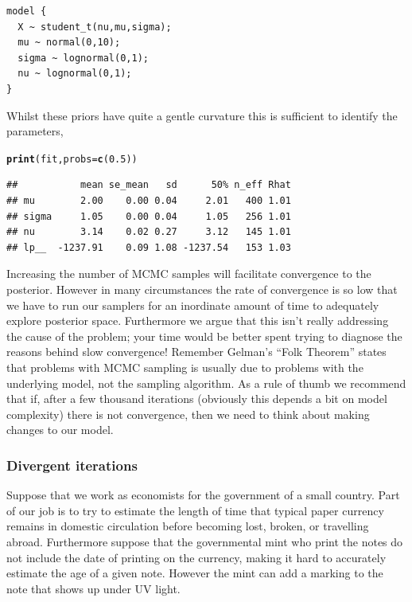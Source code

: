 \documentclass[11pt,fullpage]{book}
\makeatletter
\newenvironment{kframe}{%
	\def\at@end@of@kframe{}%
	\ifinner\ifhmode%
	\def\at@end@of@kframe{\end{minipage}}%
\begin{minipage}{\columnwidth}%
	\fi\fi%
	\def\FrameCommand##1{\hskip\@totalleftmargin \hskip-\fboxsep
		\colorbox{shadecolor}{##1}\hskip-\fboxsep
		\hskip-\linewidth \hskip-\@totalleftmargin \hskip\columnwidth}%
	\MakeFramed {\advance\hsize-\width
		\@totalleftmargin\z@ \linewidth\hsize
		\@setminipage}}%
{\par\unskip\endMakeFramed%
	\at@end@of@kframe}
\newcommand{\hlnum}[1]{\textcolor[rgb]{0.686,0.059,0.569}{#1}}%
\newcommand{\hlstd}[1]{\textcolor[rgb]{0.345,0.345,0.345}{#1}}%
\newcommand{\hlkwc}[1]{\textcolor[rgb]{0.333,0.667,0.333}{#1}}%
\newcommand{\hlkwd}[1]{\textcolor[rgb]{0.737,0.353,0.396}{\textbf{#1}}}%
\newenvironment{knitrout}{}{} %
\makeatother
\begin{document}
\begin{verbatim}
model { 
  X ~ student_t(nu,mu,sigma);
  mu ~ normal(0,10);
  sigma ~ lognormal(0,1);
  nu ~ lognormal(0,1);
}
\end{verbatim}

Whilst these priors have quite a gentle curvature this is sufficient to identify the parameters,

\begin{knitrout}\footnotesize
		\color{fgcolor}\begin{kframe}
\begin{alltt}
\hlkwd{print}\hlstd{(fit,}\hlkwc{probs} \hlstd{=} \hlkwd{c}\hlstd{(}\hlnum{0.5}\hlstd{))}
\end{alltt}
\begin{verbatim}
##           mean se_mean   sd      50% n_eff Rhat
## mu        2.00    0.00 0.04     2.01   400 1.01
## sigma     1.05    0.00 0.04     1.05   256 1.01
## nu        3.14    0.02 0.27     3.12   145 1.01
## lp__  -1237.91    0.09 1.08 -1237.54   153 1.03
\end{verbatim}
		\end{kframe}
	\end{knitrout}

Increasing the number of MCMC samples will facilitate convergence to the posterior. However in many circumstances the rate of convergence is so low that we have to run our samplers for an inordinate amount of time to adequately explore posterior space. Furthermore we argue that this isn't really addressing the cause of the problem; your time would be better spent trying to diagnose the reasons behind slow convergence! Remember Gelman's ``Folk Theorem'' states that problems with MCMC sampling is usually due to problems with the underlying model, not the sampling algorithm. As a rule of thumb we recommend that if, after a few thousand iterations (obviously this depends a bit on model complexity) there is not convergence, then we need to think about making changes to our model. 


\subsubsection{Divergent iterations}\label{sec:StanJags_divergentSolution}
Suppose that we work as economists for the government of a small country. Part of our job is to try to estimate the length of time that typical paper currency remains in domestic circulation before becoming lost, broken, or travelling abroad. Furthermore suppose that the governmental mint who print the notes do not include the date of printing on the currency, making it hard to accurately estimate the age of a given note. However the mint can add a marking to the note that shows up under UV light. 
\end{document}
